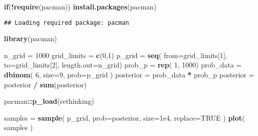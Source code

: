 \documentclass[
]{book}
\newenvironment{Shaded}{\begin{snugshade}}{\end{snugshade}}
\newcommand{\ControlFlowTok}[1]{\textcolor[rgb]{0.13,0.29,0.53}{\textbf{#1}}}
\newcommand{\DataTypeTok}[1]{\textcolor[rgb]{0.13,0.29,0.53}{#1}}
\newcommand{\DecValTok}[1]{\textcolor[rgb]{0.00,0.00,0.81}{#1}}
\newcommand{\FloatTok}[1]{\textcolor[rgb]{0.00,0.00,0.81}{#1}}
\newcommand{\KeywordTok}[1]{\textcolor[rgb]{0.13,0.29,0.53}{\textbf{#1}}}
\newcommand{\NormalTok}[1]{#1}
\newcommand{\OperatorTok}[1]{\textcolor[rgb]{0.81,0.36,0.00}{\textbf{#1}}}
\newcommand{\OtherTok}[1]{\textcolor[rgb]{0.56,0.35,0.01}{#1}}
\newcommand{\StringTok}[1]{\textcolor[rgb]{0.31,0.60,0.02}{#1}}
\begin{document}
\begin{Shaded}
\begin{Highlighting}[]
\ControlFlowTok{if}\NormalTok{(}\OperatorTok{!}\KeywordTok{require}\NormalTok{(pacman)) }\KeywordTok{install.packages}\NormalTok{(pacman)}
\end{Highlighting}
\end{Shaded}

\begin{verbatim}
## Loading required package: pacman
\end{verbatim}

\begin{Shaded}
\begin{Highlighting}[]
\KeywordTok{library}\NormalTok{(pacman)}
\end{Highlighting}
\end{Shaded}

\begin{Shaded}
\begin{Highlighting}[]
\NormalTok{n_grid =}\StringTok{ }\DecValTok{1000}
\NormalTok{grid_limits =}\StringTok{ }\KeywordTok{c}\NormalTok{(}\DecValTok{0}\NormalTok{,}\DecValTok{1}\NormalTok{)}
\NormalTok{p_grid =}\StringTok{ }\KeywordTok{seq}\NormalTok{( }\DataTypeTok{from=}\NormalTok{grid_limits[}\DecValTok{1}\NormalTok{], }\DataTypeTok{to=}\NormalTok{grid_limits[}\DecValTok{2}\NormalTok{], }\DataTypeTok{length.out=}\NormalTok{n_grid)}
\NormalTok{prob_p =}\StringTok{ }\KeywordTok{rep}\NormalTok{( }\DecValTok{1}\NormalTok{, }\DecValTok{1000}\NormalTok{)}
\NormalTok{prob_data =}\StringTok{ }\KeywordTok{dbinom}\NormalTok{( }\DecValTok{6}\NormalTok{, }\DataTypeTok{size=}\DecValTok{9}\NormalTok{, }\DataTypeTok{prob=}\NormalTok{p_grid )}
\NormalTok{posterior =}\StringTok{ }\NormalTok{prob_data }\OperatorTok{*}\StringTok{ }\NormalTok{prob_p}
\NormalTok{posterior =}\StringTok{ }\NormalTok{posterior }\OperatorTok{/}\StringTok{ }\KeywordTok{sum}\NormalTok{(posterior)}
\end{Highlighting}
\end{Shaded}

\begin{Shaded}
\begin{Highlighting}[]
\NormalTok{pacman}\OperatorTok{::}\KeywordTok{p_load}\NormalTok{(rethinking)}

\NormalTok{samples =}\StringTok{ }\KeywordTok{sample}\NormalTok{( p_grid, }\DataTypeTok{prob=}\NormalTok{posterior, }\DataTypeTok{size=}\FloatTok{1e4}\NormalTok{, }\DataTypeTok{replace=}\OtherTok{TRUE}\NormalTok{ )}
\KeywordTok{plot}\NormalTok{( samples )}
\end{Highlighting}
\end{Shaded}
\end{document}
